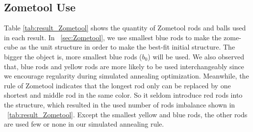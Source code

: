 \subsection{Zometool Use}
Table \ref{tab:result_Zometool} shows the quantity of Zometool rods and balls used in each result. 
In \secname~\ref{sec:Zometool}, we use smallest blue rods to make the zome-cube as the unit structure in order to make the best-fit initial structure. 
The bigger the object is, more smallest blue rods (${b_0}$) will be used.
We also observed that, blue rods and yellow rods are more likely to be used interchangeably since we encourage regularity during  simulated annealing optimization. 
Meanwhile, the rule of Zometool indicates that the longest rod only can be replaced by one shortest and middle rod in the same color.
So it seldom introduce red rods into the structure, which resulted in the used number of rods imbalance shown in \tabname~\ref{tab:result_Zometool}.
Except the smallest yellow and blue rods, the other rods are used few or none in our simulated annealing rule.

